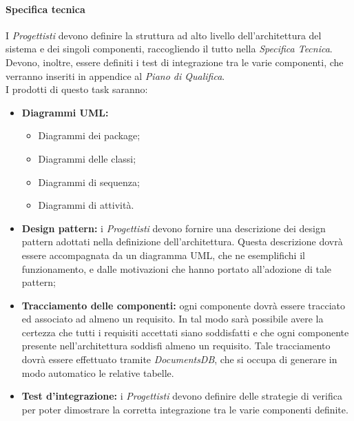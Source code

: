 \paragraph{Specifica tecnica}
I \textit{Progettisti} devono definire la struttura ad alto livello dell'architettura del sistema e dei singoli componenti, raccogliendo il tutto nella \textit{Specifica Tecnica}. Devono, inoltre, essere definiti i test di integrazione tra le varie componenti, che verranno inseriti in appendice al \textit{Piano di Qualifica}. \\
I prodotti di questo task saranno:
\begin{itemize}
	\item \textbf{Diagrammi UML:}
	\begin{itemize}
		\item Diagrammi dei package;
		\item Diagrammi delle classi;
		\item Diagrammi di sequenza;
		\item Diagrammi di attività.
	\end{itemize}
	\item \textbf{Design pattern:} i \textit{Progettisti} devono fornire una descrizione dei design pattern adottati nella definizione dell'architettura. Questa descrizione dovrà essere accompagnata da un diagramma UML, che ne esemplifichi il funzionamento, e dalle motivazioni che hanno portato all'adozione di tale pattern;
	\item \textbf{Tracciamento delle componenti:} ogni componente dovrà essere tracciato ed associato ad almeno un requisito. In tal modo sarà possibile avere la certezza che tutti i requisiti accettati siano soddisfatti e che ogni componente presente nell'architettura soddisfi almeno un requisito. Tale tracciamento dovrà essere effettuato tramite \textit{DocumentsDB}, che si occupa di generare in modo automatico le relative tabelle.
	\item \textbf{Test d'integrazione:} i \textit{Progettisti} devono definire delle strategie di verifica per poter dimostrare la corretta integrazione tra le varie componenti definite.
\end{itemize}
